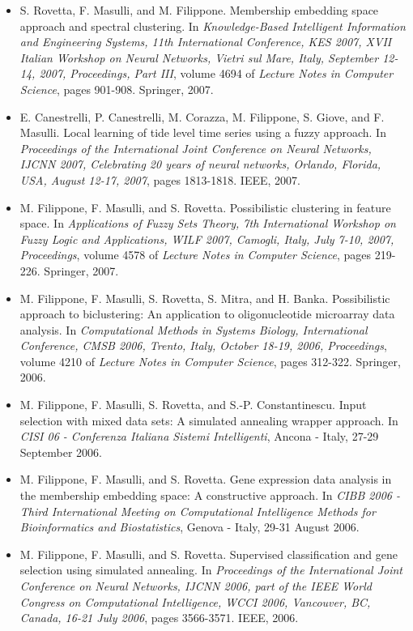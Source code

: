 \begin{itemize}
\item  S. Rovetta, F. Masulli, and M. Filippone. Membership embedding space approach and spectral clustering. In \emph{Knowledge-Based Intelligent Information and Engineering Systems, 11th International Conference, KES 2007, XVII Italian Workshop on Neural Networks, Vietri sul Mare, Italy, September 12-14, 2007, Proceedings, Part III}, volume 4694 of \emph{Lecture Notes in Computer Science}, pages 901-908. Springer, 2007.  
\item  E. Canestrelli, P. Canestrelli, M. Corazza, M. Filippone, S. Giove, and F. Masulli. Local learning of tide level time series using a fuzzy approach. In \emph{Proceedings of the International Joint Conference on Neural Networks, IJCNN 2007, Celebrating 20 years of neural networks, Orlando, Florida, USA, August 12-17, 2007}, pages 1813-1818. IEEE, 2007.  
\item  M. Filippone, F. Masulli, and S. Rovetta. Possibilistic clustering in feature space. In \emph{Applications of Fuzzy Sets Theory, 7th International Workshop on Fuzzy Logic and Applications, WILF 2007, Camogli, Italy, July 7-10, 2007, Proceedings}, volume 4578 of \emph{Lecture Notes in Computer Science}, pages 219-226. Springer, 2007.  
\item  M. Filippone, F. Masulli, S. Rovetta, S. Mitra, and H. Banka. Possibilistic approach to biclustering: An application to oligonucleotide microarray data analysis. In \emph{Computational Methods in Systems Biology, International Conference, CMSB 2006, Trento, Italy, October 18-19, 2006, Proceedings}, volume 4210 of \emph{Lecture Notes in Computer Science}, pages 312-322. Springer, 2006.  
\item  M. Filippone, F. Masulli, S. Rovetta, and S.-P. Constantinescu. Input selection with mixed data sets: A simulated annealing wrapper approach. In \emph{CISI 06 - Conferenza Italiana Sistemi Intelligenti}, Ancona - Italy, 27-29 September 2006. 
\item  M. Filippone, F. Masulli, and S. Rovetta. Gene expression data analysis in the membership embedding space: A constructive approach. In \emph{CIBB 2006 - Third International Meeting on Computational Intelligence Methods for Bioinformatics and Biostatistics}, Genova - Italy, 29-31 August 2006. 
\item  M. Filippone, F. Masulli, and S. Rovetta. Supervised classification and gene selection using simulated annealing. In \emph{Proceedings of the International Joint Conference on Neural Networks, IJCNN 2006, part of the IEEE World Congress on Computational Intelligence, WCCI 2006, Vancouver, BC, Canada, 16-21 July 2006}, pages 3566-3571. IEEE, 2006.  

\end{itemize}
